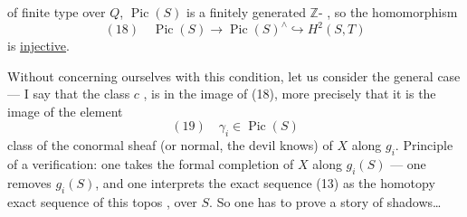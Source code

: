 of finite type over $Q$, $\operatorname{Pic}(S)$ is a finitely generated $\mathbb Z$- , so the homomorphism
\[
(18)\quad \operatorname{Pic}(S)\longrightarrow\operatorname{Pic}(S)^\wedge\hookrightarrow H^2(S,T)
\]
is \uline{injective}.

Without concerning ourselves with this condition,  let us consider the general case --- I say that the class  $c$ , is in the image of (18), more precisely that it is the image of the element
\[
(19)\quad \gamma_i\in\operatorname{Pic}(S)
\]
class of the conormal sheaf (or normal, the devil knows) of $X$ along $g_i$. Principle of a verification: one takes the formal completion of $X$ along $g_i(S)$    --- one removes $g_i(S)$, and one interprets the exact sequence (13) as the homotopy exact sequence of this  topos , over  $S$. So one has to prove a story of shadows\dots
{}
